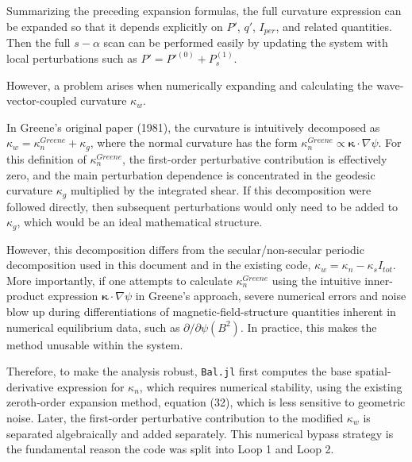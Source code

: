 \documentclass[11pt,a4paper]{article}
\begin{document}
Summarizing the preceding expansion formulas, the full curvature expression can be
expanded so that it depends explicitly on \(P'\), \(q'\), \(I_{per}\), and related
quantities. Then the full \(s-\alpha\) scan can be performed easily by updating the
system with local perturbations such as \(P' = P'^{(0)} + P_s^{(1)}\).

However, a problem arises when numerically expanding and calculating the
wave-vector-coupled curvature \(\kappa_w\).

In Greene's original paper (1981), the curvature is intuitively decomposed as
\(\kappa_w = \kappa_n^{Greene} + \kappa_g\), where the normal curvature has the form
\(\kappa_n^{Greene} \propto \boldsymbol\kappa \cdot \nabla\psi\). For this definition
of \(\kappa_n^{Greene}\), the first-order perturbative contribution is effectively
zero, and the main perturbation dependence is concentrated in the geodesic
curvature \(\kappa_g\) multiplied by the integrated shear. If this decomposition
were followed directly, then subsequent perturbations would only need to be added
to \(\kappa_g\), which would be an ideal mathematical structure.

However, this decomposition differs from the secular/non-secular periodic
decomposition used in this document and in the existing code,
\(\kappa_w = \kappa_{n} - \kappa_s I_{tot}\). More importantly, if one attempts to
calculate \(\kappa_n^{Greene}\) using the intuitive inner-product expression
\(\boldsymbol\kappa \cdot \nabla\psi\) in Greene's approach, severe numerical errors
and noise blow up during differentiations of magnetic-field-structure quantities
inherent in numerical equilibrium data, such as \(\partial/\partial\psi(B^2)\). In
practice, this makes the method unusable within the system.

Therefore, to make the analysis robust, \texttt{Bal.jl} first computes the base
spatial-derivative expression for \(\kappa_n\), which requires numerical stability,
using the existing zeroth-order expansion method, equation (32), which is less
sensitive to geometric noise. Later, the first-order perturbative contribution to
the modified \(\kappa_w\) is separated algebraically and added separately. This
numerical bypass strategy is the fundamental reason the code was split into Loop 1
and Loop 2.
\end{document}
